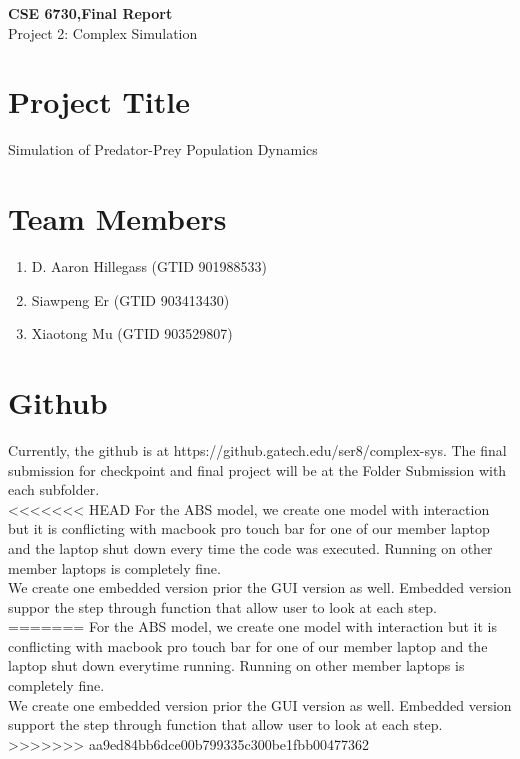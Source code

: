 \documentclass{article}
\begin{document}
	\begin{center}
		
		\LARGE{\textbf{CSE 6730,Final Report}} \\
		\vspace{1em}
		\Large{Project 2: Complex Simulation} \\
		
	\end{center}
	\begin{normalsize}
		
		\section{Project Title}
		
		Simulation of Predator-Prey Population Dynamics 
		
		\section{Team Members}
		
		\begin{enumerate}
			\item D. Aaron Hillegass (GTID 901988533)
			\item Siawpeng Er (GTID 903413430)
			\item Xiaotong Mu (GTID 903529807)
		\end{enumerate}
	
		\section{Github}
		Currently, the github is at https://github.gatech.edu/ser8/complex-sys.
		The final submission for checkpoint and final project will be at the Folder Submission with each subfolder.\\
<<<<<<< HEAD
		For the ABS model, we create one model with interaction but it is conflicting with macbook pro touch bar for one of our member laptop and the laptop shut down every time the code was executed. Running on other member laptops is completely fine. \\
		We create one embedded version prior the GUI version as well. Embedded version suppor the step through function that allow user to look at each step.
=======
		For the ABS model, we create one model with interaction but it is conflicting with macbook pro touch bar for one of our member laptop and the laptop shut down everytime running. Running on other member laptops is completely fine. \\
		We create one embedded version prior the GUI version as well. Embedded version support the step through function that allow user to look at each step.
>>>>>>> aa9ed84bb6dce00b799335c300be1fbb00477362


\end{normalsize}
\end{document}
